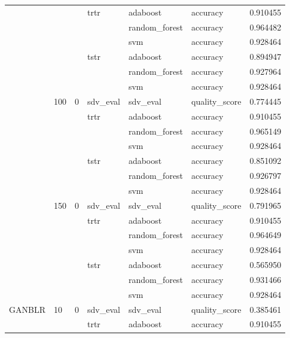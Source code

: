 \begin{longtable}{llllllr}
 &  &  & \multirow[t]{3}{*}{trtr} & adaboost & accuracy & 0.910455 \\
\cline{5-7}
 &  &  &  & random_forest & accuracy & 0.964482 \\
\cline{5-7}
 &  &  &  & svm & accuracy & 0.928464 \\
\cline{4-7} \cline{5-7}
 &  &  & \multirow[t]{3}{*}{tstr} & adaboost & accuracy & 0.894947 \\
\cline{5-7}
 &  &  &  & random_forest & accuracy & 0.927964 \\
\cline{5-7}
 &  &  &  & svm & accuracy & 0.928464 \\
\cline{2-7} \cline{3-7} \cline{4-7} \cline{5-7}
 & \multirow[t]{7}{*}{100} & \multirow[t]{7}{*}{0} & sdv_eval & sdv_eval & quality_score & 0.774445 \\
\cline{4-7} \cline{5-7}
 &  &  & \multirow[t]{3}{*}{trtr} & adaboost & accuracy & 0.910455 \\
\cline{5-7}
 &  &  &  & random_forest & accuracy & 0.965149 \\
\cline{5-7}
 &  &  &  & svm & accuracy & 0.928464 \\
\cline{4-7} \cline{5-7}
 &  &  & \multirow[t]{3}{*}{tstr} & adaboost & accuracy & 0.851092 \\
\cline{5-7}
 &  &  &  & random_forest & accuracy & 0.926797 \\
\cline{5-7}
 &  &  &  & svm & accuracy & 0.928464 \\
\cline{2-7} \cline{3-7} \cline{4-7} \cline{5-7}
 & \multirow[t]{7}{*}{150} & \multirow[t]{7}{*}{0} & sdv_eval & sdv_eval & quality_score & 0.791965 \\
\cline{4-7} \cline{5-7}
 &  &  & \multirow[t]{3}{*}{trtr} & adaboost & accuracy & 0.910455 \\
\cline{5-7}
 &  &  &  & random_forest & accuracy & 0.964649 \\
\cline{5-7}
 &  &  &  & svm & accuracy & 0.928464 \\
\cline{4-7} \cline{5-7}
 &  &  & \multirow[t]{3}{*}{tstr} & adaboost & accuracy & 0.565950 \\
\cline{5-7}
 &  &  &  & random_forest & accuracy & 0.931466 \\
\cline{5-7}
 &  &  &  & svm & accuracy & 0.928464 \\
\cline{1-7} \cline{2-7} \cline{3-7} \cline{4-7} \cline{5-7}
\multirow[t]{70}{*}{GANBLR} & \multirow[t]{14}{*}{10} & \multirow[t]{7}{*}{0} & sdv_eval & sdv_eval & quality_score & 0.385461 \\
\cline{4-7} \cline{5-7}
 &  &  & \multirow[t]{3}{*}{trtr} & adaboost & accuracy & 0.910455 \\

\end{longtable}
